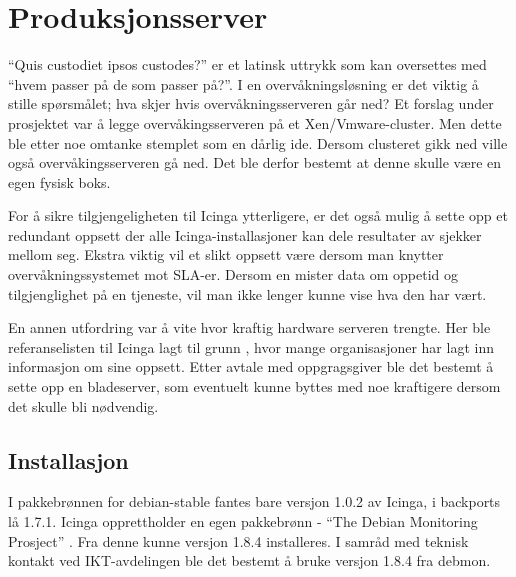 \section{Produksjonsserver}
“Quis custodiet ipsos custodes?” er et latinsk uttrykk som kan oversettes med “hvem passer på de som passer på?”. I en overvåkningsløsning er det viktig å stille spørsmålet; hva skjer hvis overvåkningsserveren går ned? Et forslag under prosjektet var å legge overvåkingsserveren på et Xen/Vmware-cluster. Men dette ble etter noe omtanke stemplet som en dårlig ide. Dersom clusteret gikk ned ville også overvåkingsserveren gå ned. Det ble derfor bestemt at denne skulle være en egen fysisk boks. 

For å sikre tilgjengeligheten til Icinga ytterligere, er det også mulig å sette opp et redundant oppsett der alle Icinga-installasjoner kan dele resultater av sjekker mellom seg. Ekstra viktig vil et slikt oppsett være dersom man knytter overvåkningssystemet mot SLA-er. Dersom en mister data om oppetid og tilgjenglighet på en tjeneste, vil man ikke lenger kunne vise hva den har vært.

En annen utfordring var å vite hvor kraftig hardware serveren trengte. Her ble referanselisten til Icinga lagt til grunn \cite{icingainaction}, hvor mange organisasjoner har lagt inn informasjon om sine oppsett. Etter avtale med oppgragsgiver ble det bestemt å sette opp en bladeserver, som eventuelt kunne byttes med noe kraftigere dersom det skulle bli nødvendig. 

\subsection{Installasjon}
I pakkebrønnen for debian-stable fantes bare versjon 1.0.2 av Icinga, i backports lå 1.7.1. Icinga opprettholder en egen pakkebrønn - “The Debian Monitoring Prosject” \cite{debmon}. Fra denne kunne versjon 1.8.4 installeres. I samråd med teknisk kontakt ved IKT-avdelingen ble det bestemt å bruke versjon 1.8.4 fra debmon.

